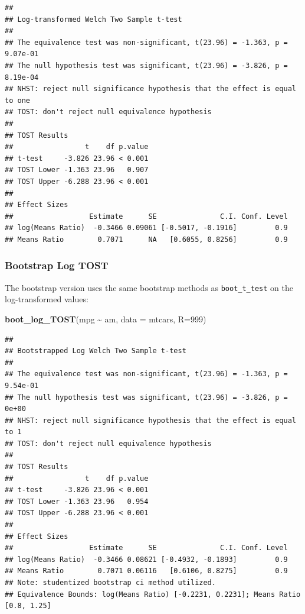 \documentclass[]{interact}
\theoremstyle{plain}%
\theoremstyle{definition}
\theoremstyle{remark}
\newenvironment{Shaded}{\begin{snugshade}}{\end{snugshade}}
\newcommand{\AttributeTok}[1]{\textcolor[rgb]{0.13,0.29,0.53}{#1}}
\newcommand{\DecValTok}[1]{\textcolor[rgb]{0.00,0.00,0.81}{#1}}
\newcommand{\FunctionTok}[1]{\textcolor[rgb]{0.13,0.29,0.53}{\textbf{#1}}}
\newcommand{\NormalTok}[1]{#1}
\newcommand{\SpecialCharTok}[1]{\textcolor[rgb]{0.81,0.36,0.00}{\textbf{#1}}}
\begin{document}
\begin{verbatim}
## 
## Log-transformed Welch Two Sample t-test
## 
## The equivalence test was non-significant, t(23.96) = -1.363, p = 9.07e-01
## The null hypothesis test was significant, t(23.96) = -3.826, p = 8.19e-04
## NHST: reject null significance hypothesis that the effect is equal to one 
## TOST: don't reject null equivalence hypothesis
## 
## TOST Results 
##                 t    df p.value
## t-test     -3.826 23.96 < 0.001
## TOST Lower -1.363 23.96   0.907
## TOST Upper -6.288 23.96 < 0.001
## 
## Effect Sizes 
##                  Estimate      SE               C.I. Conf. Level
## log(Means Ratio)  -0.3466 0.09061 [-0.5017, -0.1916]         0.9
## Means Ratio        0.7071      NA   [0.6055, 0.8256]         0.9
\end{verbatim}

\newpage

\subsubsection{Bootstrap Log TOST}\label{bootstrap-log-tost}

The bootstrap version uses the same bootstrap methods as
\texttt{boot\_t\_test} on the log-transformed values:

\begin{Shaded}
\begin{Highlighting}[]
\FunctionTok{boot\_log\_TOST}\NormalTok{(mpg }\SpecialCharTok{\textasciitilde{}}\NormalTok{ am, }\AttributeTok{data =}\NormalTok{ mtcars, }\AttributeTok{R=}\DecValTok{999}\NormalTok{)}
\end{Highlighting}
\end{Shaded}

\begin{verbatim}
## 
## Bootstrapped Log Welch Two Sample t-test
## 
## The equivalence test was non-significant, t(23.96) = -1.363, p = 9.54e-01
## The null hypothesis test was significant, t(23.96) = -3.826, p = 0e+00
## NHST: reject null significance hypothesis that the effect is equal to 1 
## TOST: don't reject null equivalence hypothesis
## 
## TOST Results 
##                 t    df p.value
## t-test     -3.826 23.96 < 0.001
## TOST Lower -1.363 23.96   0.954
## TOST Upper -6.288 23.96 < 0.001
## 
## Effect Sizes 
##                  Estimate      SE               C.I. Conf. Level
## log(Means Ratio)  -0.3466 0.08621 [-0.4932, -0.1893]         0.9
## Means Ratio        0.7071 0.06116   [0.6106, 0.8275]         0.9
## Note: studentized bootstrap ci method utilized.
## Equivalence Bounds: log(Means Ratio) [-0.2231, 0.2231]; Means Ratio [0.8, 1.25]
\end{verbatim}
\end{document}

